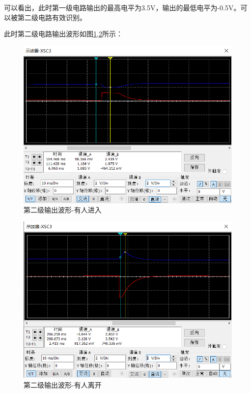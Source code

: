 \documentclass{article}
\begin{document}
\begin{spacing}{1.5}
    可以看出，此时第一级电路输出的最高电平为3.5V，输出的最低电平为-0.5V。可以被第二级电路有效识别。

    此时第二级电路输出波形如图\ref{fig:sim4_result9},\ref{fig:sim4_result8}所示：

    \begin{figure}[H]
        \centering
        \includegraphics[scale=0.4]{fig/sim/sim4_result9.png}
        \caption{第二级输出波形-有人进入}
        \label{fig:sim4_result9}
    \end{figure}

    \begin{figure}[H]
        \centering
        \includegraphics[scale=0.4]{fig/sim/sim4_result8.png}
        \caption{第二级输出波形-有人离开}
        \label{fig:sim4_result8}
    \end{figure}


\end{spacing}
\end{document}
